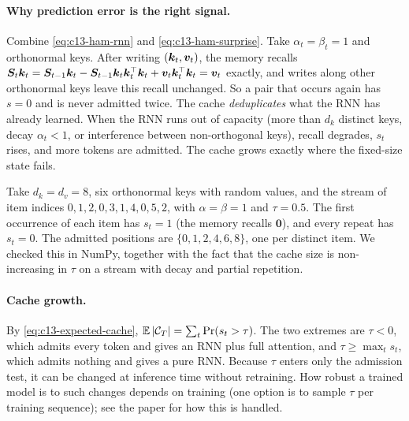 \paragraph{Why prediction error is the right signal.} Combine \eqref{eq:c13-ham-rnn} and
\eqref{eq:c13-ham-surprise}. Take $\alpha_t=\beta_t=1$ and orthonormal keys. After writing
$(\bm{k}_t,\bm{v}_t)$, the memory recalls $\bm{S}_t\bm{k}_t = \bm{S}_{t-1}\bm{k}_t-\bm{S}_{t-1}\bm{k}_t\bm{k}_t^{\top}\bm{k}_t+\bm{v}_t\bm{k}_t^{\top}\bm{k}_t=\bm{v}_t$
exactly, and writes along other orthonormal keys leave this recall unchanged. So a pair that occurs again has
$s=0$ and is never admitted twice. The cache \emph{deduplicates} what the RNN has already learned. When
the RNN runs out of capacity (more than $d_k$ distinct keys, decay $\alpha_t<1$, or interference between
non-orthogonal keys), recall degrades, $s_t$ rises, and more tokens are admitted. The cache grows exactly
where the fixed-size state fails.

\begin{example}[Deduplication]\label{ex:c13-ham-dedup}
Take $d_k=d_v=8$, six orthonormal keys with random values, and the stream of item indices
$0,1,2,0,3,1,4,0,5,2$, with $\alpha=\beta=1$ and $\tau=0.5$. The first occurrence of each item has
$s_t=1$ (the memory recalls $\bm{0}$), and every repeat has $s_t=0$. The admitted positions are
$\{0,1,2,4,6,8\}$, one per distinct item. We checked this in NumPy, together with the fact that the
cache size is non-increasing in $\tau$ on a stream with decay and partial repetition.
\end{example}

\paragraph{Cache growth.} By \eqref{eq:c13-expected-cache}, $\mathbb{E}\left\lvert \mathcal{C}_T\right\rvert=\sum_t\Pr(s_t>\tau)$.
The two extremes are $\tau<0$, which admits every token and gives an RNN plus full attention, and
$\tau\ge\max_t s_t$, which admits nothing and gives a pure RNN. Because $\tau$ enters only the
admission test, it can be changed at inference time without retraining. How robust a trained model is
to such changes depends on training (one option is to sample $\tau$ per training sequence); see the
paper for how this is handled.

